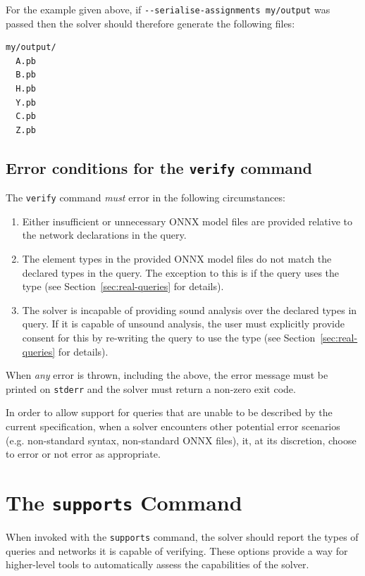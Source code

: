 For the example given above, if \texttt{{-}-serialise-assignments my/output} was passed then the solver should therefore generate the following files:
\begin{lstlisting}[style=bash]
my/output/
  A.pb
  B.pb
  H.pb
  Y.pb
  C.pb
  Z.pb
\end{lstlisting}

\subsection{Error conditions for the \texttt{verify} command}

The \texttt{verify} command \textit{must} error in the following circumstances:
\begin{enumerate}
\item Either insufficient or unnecessary ONNX model files are provided relative to the network declarations in the \vnnlib{} query.
\item The element types in the provided ONNX model files do not match the declared types in the \vnnlib{} query. The exception to this is if the query uses the  type (see Section~\ref{sec:real-queries} for details).
\item The solver is incapable of providing sound analysis over the declared types in \vnnlib{} query. If it is capable of unsound analysis, the user must explicitly provide consent for this by re-writing the query to use the  type (see Section~\ref{sec:real-queries} for details).
\end{enumerate}
When \textit{any} error is thrown, including the above, the error message must be printed on \texttt{stderr} and the solver must return a non-zero exit code.

In order to allow support for queries that are unable to be described by the current \vnnlib{} specification, when a solver encounters other potential error scenarios (e.g. non-standard \vnnlib{} syntax, non-standard ONNX files), it, at its discretion, choose to error or not error as appropriate.

\section{The \texttt{supports} Command}
\label{sec:global_capabilities}

When invoked with the \texttt{supports} command, the solver should report the types of queries and networks it is capable of verifying.
These options provide a way for higher-level tools to automatically assess the capabilities of the solver.

